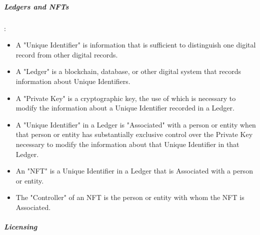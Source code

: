\documentclass{article}
\begin{document}
	\subparagraph{Ledgers and NFTs}:

	\begin{itemize}
	\item	A "Unique Identifier" is information that is sufficient to distinguish one digital record from other digital records.
		
	\item	A "Ledger" is a blockchain, database, or other digital system that records information about Unique Identifiers.
		
	\item	A "Private Key" is a cryptographic key, the use of which is necessary to modify the information about a Unique Identifier recorded in a Ledger.
		
	\item	A "Unique Identifier" in a Ledger is "Associated" with a person or entity when that person or entity has substantially exclusive control over the Private Key necessary to modify the information about that Unique Identifier in that Ledger.
		
	\item	An "NFT" is a Unique Identifier in a Ledger that is Associated with a person or entity.
		
	\item	The "Controller" of an NFT is the person or entity with whom the NFT is Associated.
	\end{itemize}

	\subparagraph{Licensing}
\end{document}
